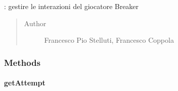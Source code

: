 \documentclass[letterpaper,10pt,italian]{sphinxmanual}
\begin{document}
\begin{fulllineitems}
\label{\detokenize{source/it/unicam/cs/pa/mastermind/players/CodeBreaker:it.unicam.cs.pa.mastermind.players.CodeBreaker}}
: gestire le interazioni del giocatore Breaker
\begin{quote}\begin{description}
\item[{Author}] \leavevmode
Francesco Pio Stelluti, Francesco Coppola

\end{description}\end{quote}

\end{fulllineitems}



\subsubsection{Methods}
\label{\detokenize{source/it/unicam/cs/pa/mastermind/players/CodeBreaker:methods}}

\paragraph{getAttempt}
\label{\detokenize{source/it/unicam/cs/pa/mastermind/players/CodeBreaker:getattempt}}
\end{document}
